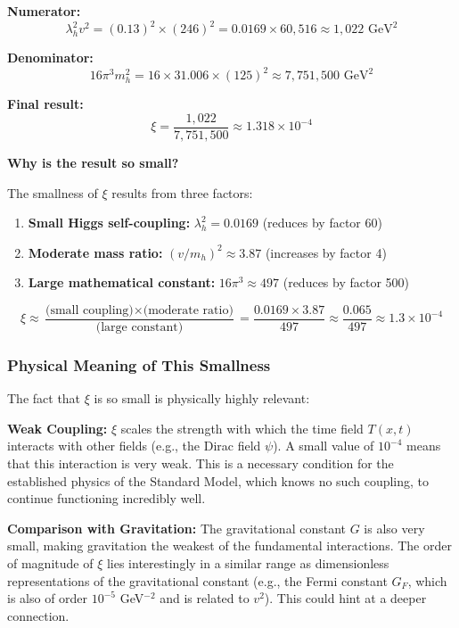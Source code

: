 \documentclass[12pt,a4paper]{article}
\begin{document}
\textbf{Numerator:} 
\begin{equation}
	\lambda_h^2 v^2 = (0.13)^2 \times (246)^2 = 0.0169 \times 60,516 \approx 1,022 \text{ GeV}^2
\end{equation}

\textbf{Denominator:}
\begin{equation}
	16\pi^3 m_h^2 = 16 \times 31.006 \times (125)^2 \approx 7,751,500 \text{ GeV}^2
\end{equation}

\textbf{Final result:}
\begin{equation}
	\xi = \frac{1,022}{7,751,500} \approx 1.318 \times 10^{-4}
\end{equation}

\textbf{Why is the result so small?}

The smallness of $\xi$ results from three factors:
\begin{enumerate}
	\item \textbf{Small Higgs self-coupling:} $\lambda_h^2 = 0.0169$ (reduces by factor 60)
	\item \textbf{Moderate mass ratio:} $(v/m_h)^2 \approx 3.87$ (increases by factor 4)
	\item \textbf{Large mathematical constant:} $16\pi^3 \approx 497$ (reduces by factor 500)
\end{enumerate}

\begin{equation}
	\xi \approx \frac{\text{(small coupling)} \times \text{(moderate ratio)}}{\text{(large constant)}} = \frac{0.0169 \times 3.87}{497} \approx \frac{0.065}{497} \approx 1.3 \times 10^{-4}
\end{equation}

\subsubsection{Physical Meaning of This Smallness}
\label{subsubsec:physical_meaning_smallness}

The fact that $\xi$ is so small is physically highly relevant:

\textbf{Weak Coupling:} $\xi$ scales the strength with which the time field $T(x,t)$ interacts with other fields (e.g., the Dirac field $\psi$). A small value of $10^{-4}$ means that this interaction is very weak. This is a necessary condition for the established physics of the Standard Model, which knows no such coupling, to continue functioning incredibly well.

\textbf{Comparison with Gravitation:} The gravitational constant $G$ is also very small, making gravitation the weakest of the fundamental interactions. The order of magnitude of $\xi$ lies interestingly in a similar range as dimensionless representations of the gravitational constant (e.g., the Fermi constant $G_F$, which is also of order $10^{-5}$ GeV$^{-2}$ and is related to $v^2$). This could hint at a deeper connection.
\end{document}
